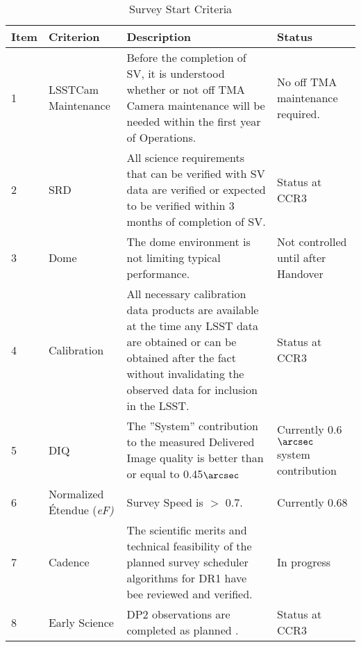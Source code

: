 \begin{table}[]
\renewcommand{\arraystretch}{2}
\small
\centering
\caption{Survey Start Criteria}\label{tab:criteria}
\begin{tabular}{|p{0.25in}|p{1in}|p{4in}|p{1.0in}|}
\hline
Item & Criterion & Description& Status \\
\hline \hline

1 & \makecell[l]{LSSTCam\\ Maintenance} & Before the completion of SV, it is understood whether or not off TMA Camera maintenance will be needed within the first year of Operations.& No off TMA maintenance required.  \\\hline  

2 & SRD & All science requirements that can be verified with SV data are verified or expected to be verified within 3 months of completion of SV. & Status at CCR3 \\\hline

3 & Dome & The dome environment is not limiting typical performance. &\makecell[l]{ Not controlled \\until after \\Handover} \\\hline

4 & Calibration & All necessary calibration data products are available at the time any LSST data are obtained or can be obtained after the fact without invalidating the observed data for inclusion in the LSST. & Status at CCR3 \\\hline

5 & DIQ & The ''System'' contribution to the measured Delivered Image quality is better than or equal to 0.45$\arcsec$ & \makecell[l]{Currently 0.6$\arcsec$ \\system \\contribution}\\\hline

6 & Normalized \'{E}tendue (\it{eF}) & Survey Speed  is $>$ 0.7. & Currently 0.68 \\\hline

7 & Cadence & The scientific merits and technical feasibility of the planned survey scheduler algorithms for DR1 have bee reviewed and verified. & In progress\\\hline

8 & Early Science & DP2 observations are completed as planned \citep{RTN-011}.& Status at CCR3 \\

\hline
\end{tabular}
\end{table}

